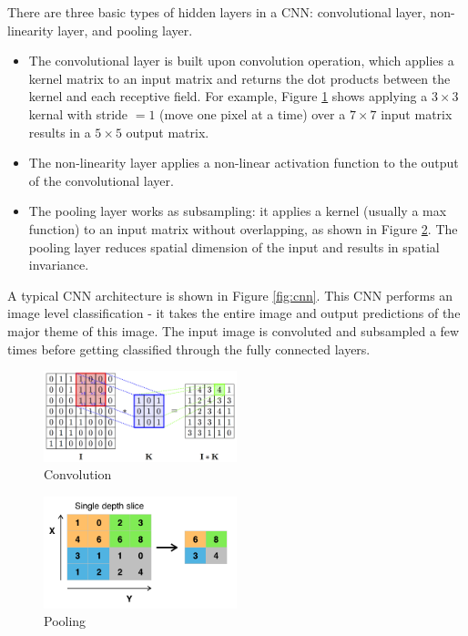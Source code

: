 \documentclass{article}
\begin{document}
There are three basic types of hidden layers in a CNN: convolutional layer, non-linearity layer, and pooling layer. 

\begin{itemize}
    \item The convolutional layer is built upon convolution operation, which applies a kernel matrix to an input matrix and returns the dot products between the kernel and each receptive field. For example, Figure \ref{fig:convolution} shows applying a $3\times 3$ kernal with stride $=1$ (move one pixel at a time) over a $7\times7$ input matrix results in a $5\times5$ output matrix. 

    \item The non-linearity layer applies a non-linear activation function to the output of the convolutional layer. 
    
    \item The pooling layer works as subsampling: it applies a kernel (usually a max function) to an input matrix without overlapping, as shown in Figure \ref{fig:pooling}. The pooling layer reduces spatial dimension of the input and results in spatial invariance. 
\end{itemize}

A typical CNN architecture is shown in Figure \ref{fig:cnn}. This CNN performs an image level classification - it takes the entire image and output predictions of the major theme of this image. The input image is convoluted and subsampled a few times before getting classified through the fully connected layers.   


\begin{figure}
    \centering
    \includegraphics[width=0.5\textwidth]{21/convolution.png}
    \caption{Convolution}
    \label{fig:convolution}
\end{figure}

\begin{figure}
    \centering
    \includegraphics[width=0.5\textwidth]{21/pooling.png}
    \caption{Pooling}
    \label{fig:pooling}
\end{figure}
\end{document}

